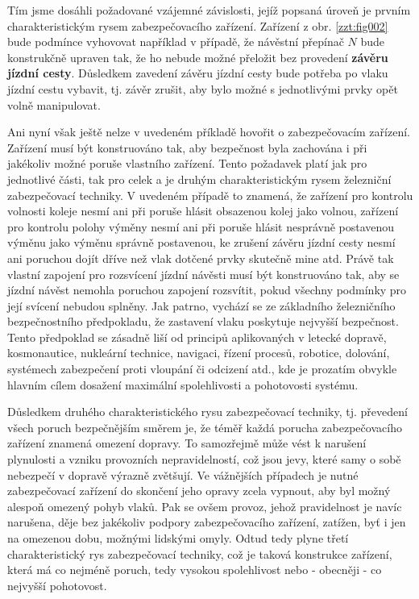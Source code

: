 {  Tím jsme dosáhli požadované vzájemné závislosti, jejíž popsaná úroveň je prvním charakteristickým 
  rysem zabezpečovacího zařízení. Zařízení z obr. \ref{zzt:fig002} bude podmínce vyhovovat 
  například v případě, že návěstní přepínač \(N\) bude konstrukčně upraven tak, že ho nebude možné 
  přeložit bez provedení \textbf{závěru jízdní cesty}. Důsledkem zavedení závěru jízdní cesty bude 
  potřeba po vlaku jízdní cestu vybavit, tj. závěr zrušit, aby bylo možné s jednotlivými prvky opět 
  volně manipulovat. 

  Ani nyní však ještě nelze v uvedeném příkladě hovořit o zabezpečovacím zařízení. Zařízení musí
  být konstruováno tak, aby bezpečnost byla zachována i při jakékoliv možné poruše vlastního 
  zařízení. Tento  požadavek platí jak pro jednotlivé části, tak pro celek a je druhým 
  charakteristickým rysem železniční zabezpečovací techniky. V uvedeném případě to znamená, že 
  zařízení pro kontrolu volnosti koleje nesmí ani při poruše hlásit obsazenou kolej jako volnou, 
  zařízení pro kontrolu polohy výměny nesmí ani při poruše hlásit nesprávně postavenou výměnu jako 
  výměnu správně postavenou, ke zrušení závěru jízdní cesty nesmí ani poruchou dojít dříve než vlak 
  dotčené prvky skutečně mine atd. Právě tak vlastní zapojení pro rozsvícení jízdní návěsti musí 
  být konstruováno tak, aby se jízdní návěst nemohla poruchou zapojení rozsvítit, pokud všechny 
  podmínky pro její svícení nebudou splněny. Jak patrno, vychází se ze základního železničního
  bezpečnostního předpokladu, že zastavení vlaku poskytuje nejvyšší bezpečnost. Tento předpoklad se 
  zásadně liší od principů aplikovaných v letecké dopravě, kosmonautice, nukleární technice, 
  navigaci, řízení procesů, robotice, dolování, systémech zabezpečení proti vloupání či odcizení 
  atd., kde je prozatím obvykle hlavním cílem dosažení maximální spolehlivosti a pohotovosti 
  systému.
  
  Důsledkem druhého charakteristického rysu zabezpečovací techniky, tj. převedení všech poruch
  bezpečnějším směrem je, že téměř každá porucha zabezpečovacího zařízení znamená omezení dopravy. 
  To samozřejmě může vést k narušení plynulosti a vzniku provozních nepravidelností, což jsou jevy, 
  které samy o sobě nebezpečí v dopravě výrazně zvětšují. Ve vážnějších případech je nutné 
  zabezpečovací zařízení do skončení jeho opravy zcela vypnout, aby byl možný alespoň omezený pohyb 
  vlaků. Pak se ovšem provoz, jehož pravidelnost je navíc narušena, děje bez jakékoliv podpory 
  zabezpečovacího zařízení, zatížen, byť i jen na omezenou dobu, možnými lidskými omyly. Odtud tedy 
  plyne třetí charakteristický rys zabezpečovací techniky, což je taková konstrukce zařízení, která 
  má co nejméně poruch, tedy vysokou spolehlivost nebo - obecněji - co nejvyšší pohotovost. 
 
}
